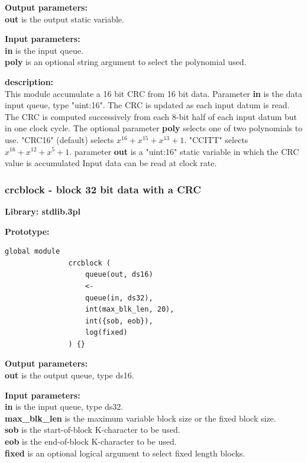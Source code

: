             {\bf Output parameters:} \\
            {\bf out} is the output static variable.

            {\bf Input parameters:} \\
            {\bf in} is the input queue.\\
            {\bf poly} is an optional string argument to select the polynomial
            used.

            {\bf description:} \\
            This module accumulate a 16 bit CRC from 16 bit data. Parameter {\bf
            in} is the data input queue, type "uint:16". The CRC is updated as
            each input datum is read. The CRC is computed successively from each
            8-bit half of each input datum but in one clock cycle. The optional
            parameter {\bf poly} selects one of two polynomials to use. "CRC16"
            (default) selects $x^{16} + x^{15} + x^{13} + 1$. "CCITT" selects
            $x^{16} + x^{12} + x^5 + 1$. parameter {\bf out} is a "uint:16"
            static variable in which the CRC value is accumulated Input data can
            be read at clock rate.








    
        \subsubsection{crcblock - block 32 bit data with a CRC}\label{sec:lmcrcblock}


            {\bf Library: stdlib.3pl}

            {\bf Prototype:} \\
            \vsp
            \begin{lstlisting}[gobble=12, language=threepl]
               global module
               crcblock (
                   queue(out, ds16)
                   <-
                   queue(in, ds32),
                   int(max_blk_len, 20),
                   int({sob, eob}),
                   log(fixed)
               ) {}
            \end{lstlisting}

            {\bf Output parameters:} \\
            {\bf out} is the output queue, type ds16.

            {\bf Input parameters:} \\
            {\bf in} is the input queue, type ds32.\\
            {\bf max\_blk\_len} is the maximum variable block size or the fixed
                    block size.\\
            {\bf sob} is the start-of-block K-character to be used.\\
            {\bf eob} is the end-of-block K-character to be used.\\
            {\bf fixed} is an optional logical argument to select fixed
                    length blocks.

